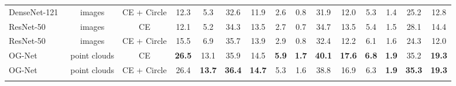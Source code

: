 \documentclass[journal]{IEEEtran}
\begin{document}
\begin{table*}
{{\begin{tabular}{l|c|c|cc|cc|cc|cc|cc|cc}
DenseNet-121~\cite{Huang2017Densely} & images & CE + Circle & 12.3 & 5.3 & 32.6 & 11.9 & 2.6 & 0.8 & 31.9 & 12.0 & 5.3 & 1.4 & 25.2 & 12.8 \\
ResNet-50~\cite{he2016deep} & images & CE & 12.1 & 5.2 & 34.3 & 13.5 & 2.7 & 0.7 & 34.7 & 13.5 & 5.4 & 1.5 & 28.1 & 14.4 \\
ResNet-50~\cite{he2016deep} & images & CE + Circle & 15.5 & 6.9 & 35.7 & 13.9 & 2.9 & 0.8 & 32.4 & 12.2 & 6.1 & 1.6 & 24.3 & 12.0 \\
\hline
OG-Net & point clouds & CE & \textbf{26.5} & 13.1 & 35.9 & 14.5 & \textbf{5.9} & \textbf{1.7} & \textbf{40.1} & \textbf{17.6} & \textbf{6.8} & \textbf{1.9} & 35.2 & \textbf{19.3} \\
OG-Net & point clouds & CE + Circle & 26.4 & \textbf{13.7} & \textbf{36.4} & \textbf{14.7} & 5.3 & 1.6 & 38.8 & 16.9 & 6.3 & \textbf{1.9}  & \textbf{35.3} &  \textbf{19.3} \\
\shline
\end{tabular}}
}
\end{table*}

\setlength{\tabcolsep}{8pt}
\begin{table}{
\caption{Effectiveness of different components. We compare the network variants, including squeeze-excitation (SE), the usage of KNN Graph and the last non-local attention in the model. 
}\label{table:components}}
{
}
\end{table}

\setlength{\tabcolsep}{13pt}
\begin{table}{
\caption{Effectiveness of the short-cut connection. We observe a similar result with~\cite{he2016deep} that the improvement from the short-cut connection is not significant on the ``shallow'' network, while it works well on the relatively deep network structure.
}\label{table:res}}
{
}
\end{table}
\end{document}
